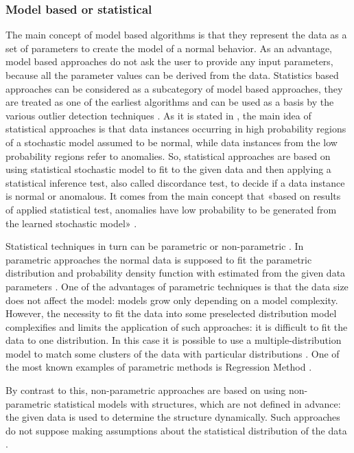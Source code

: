 \subsubsection{Model based \cite{article:6_survey_anom_det_rtuvs}\cite{inproceedings:18_ardod_lstd} or statistical \cite{article:15_survey_ad}}
The main concept of model based algorithms is that they represent the data as a set of parameters to create the model of a normal behavior. As an advantage, model based approaches do not ask the user to provide any input parameters, because all the parameter values can be derived from the data. Statistics based approaches can be considered as a subcategory of model based approaches, they are treated as one of the earliest algorithms and can be used as a basis by the various outlier detection techniques \cite{article:comp_analys_odt}. As it is stated in \cite{article:15_survey_ad}, the main idea of statistical approaches is that data instances occurring in high probability regions of a stochastic model assumed to be normal, while data instances from the low probability regions refer to anomalies. So, statistical approaches are based on using statistical stochastic model to fit to the given data and then applying a statistical inference test, also called discordance test, to decide if a data instance is normal or anomalous. It comes from the main concept that «based on results of applied statistical test, anomalies have low probability to be generated from the learned stochastic model» \cite{article:15_survey_ad}.

Statistical techniques in turn can be parametric or non-parametric \cite{article:comp_analys_odt}. In parametric approaches the normal data is supposed to fit the parametric distribution and probability density function with estimated from the given data parameters \cite{article:6_survey_anom_det_rtuvs}. One of the advantages of parametric techniques is that the data size does not affect the model: models grow only depending on a model complexity. However, the necessity to fit the data into some preselected distribution model complexifies and limits the application of such approaches: it is difficult to fit the data to one distribution. In this case it is possible to use a multiple-distribution model to match some clusters of the data with particular distributions \cite{inproceedings:18_ardod_lstd}. One of the most known examples of parametric methods is Regression Method \cite{article:comp_analys_odt}.

By contrast to this, non-parametric approaches are based on using non-parametric statistical models with structures, which are not defined in advance: the given data is used to determine the structure dynamically. Such approaches do not suppose making assumptions about the statistical distribution of the data \cite{article:comp_analys_odt}.

